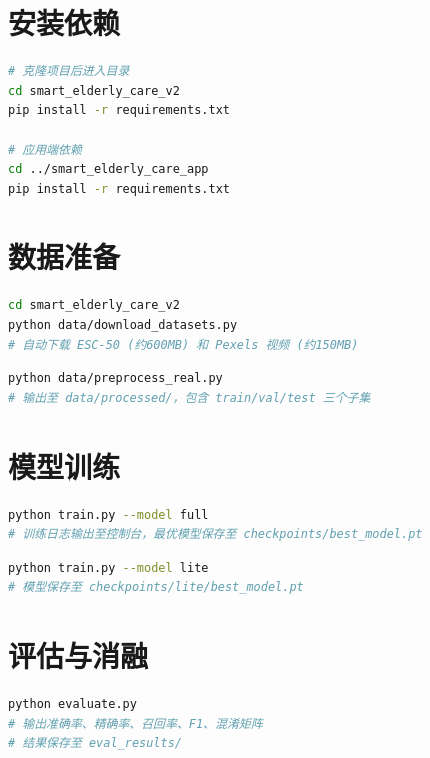 \section{安装依赖}

\begin{lstlisting}[language=bash,caption={安装依赖}]
# 克隆项目后进入目录
cd smart_elderly_care_v2
pip install -r requirements.txt

# 应用端依赖
cd ../smart_elderly_care_app
pip install -r requirements.txt
\end{lstlisting}

\section{数据准备}

\begin{lstlisting}[language=bash,caption={下载ESC-50与Pexels视频数据集}]
cd smart_elderly_care_v2
python data/download_datasets.py
# 自动下载 ESC-50 (约600MB) 和 Pexels 视频 (约150MB)
\end{lstlisting}

\begin{lstlisting}[language=bash,caption={数据预处理（特征提取与数据集构建）}]
python data/preprocess_real.py
# 输出至 data/processed/，包含 train/val/test 三个子集
\end{lstlisting}

\section{模型训练}

\begin{lstlisting}[language=bash,caption={训练Full模型（Cross-Modal Attention）}]
python train.py --model full
# 训练日志输出至控制台，最优模型保存至 checkpoints/best_model.pt
\end{lstlisting}

\begin{lstlisting}[language=bash,caption={训练Lite模型（消融对照）}]
python train.py --model lite
# 模型保存至 checkpoints/lite/best_model.pt
\end{lstlisting}

\section{评估与消融}

\begin{lstlisting}[language=bash,caption={模型评估}]
python evaluate.py
# 输出准确率、精确率、召回率、F1、混淆矩阵
# 结果保存至 eval_results/
\end{lstlisting}


